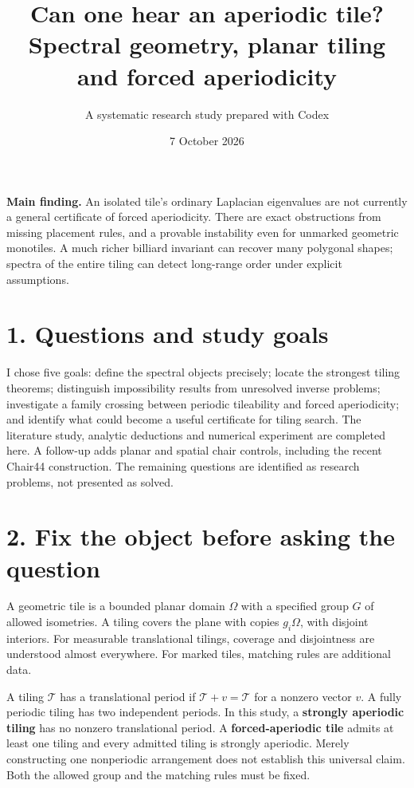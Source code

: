 \documentclass[11pt]{article}
\title{\Huge Can one hear an aperiodic tile?\\[10pt]\large Spectral geometry, planar tiling and forced aperiodicity}
\author{A systematic research study prepared with Codex}
\date{7 October 2026}
\begin{document}
\maketitle


\textbf{Main finding.} An isolated tile's ordinary Laplacian eigenvalues are not currently a general certificate of forced aperiodicity. There are exact obstructions from missing placement rules, and a provable instability even for unmarked geometric monotiles. A much richer billiard invariant can recover many polygonal shapes; spectra of the entire tiling can detect long-range order under explicit assumptions.




\section*{1. Questions and study goals}


I chose five goals: define the spectral objects precisely; locate the strongest tiling theorems; distinguish impossibility results from unresolved inverse problems; investigate a family crossing between periodic tileability and forced aperiodicity; and identify what could become a useful certificate for tiling search. The literature study, analytic deductions and numerical experiment are completed here. A follow-up adds planar and spatial chair controls, including the recent Chair44 construction. The remaining questions are identified as research problems, not presented as solved.





\section*{2. Fix the object before asking the question}


A geometric tile is a bounded planar domain \(\Omega\) with a specified group \(G\) of allowed isometries. A tiling covers the plane with copies \(g_i\Omega\), with disjoint interiors. For measurable translational tilings, coverage and disjointness are understood almost everywhere. For marked tiles, matching rules are additional data.



A tiling \(\mathcal T\) has a translational period if \(\mathcal T+v=\mathcal T\) for a nonzero vector \(v\). A fully periodic tiling has two independent periods. In this study, a \textbf{strongly aperiodic tiling} has no nonzero translational period. A \textbf{forced-aperiodic tile} admits at least one tiling and every admitted tiling is strongly aperiodic. Merely constructing one nonperiodic arrangement does not establish this universal claim. Both the allowed group and the matching rules must be fixed.
\end{document}
